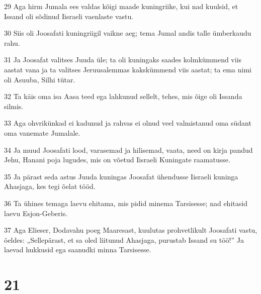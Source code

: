 \par 29 Aga hirm Jumala ees valdas kõigi maade kuningriike, kui nad kuulsid, et Issand oli sõdinud Iisraeli vaenlaste vastu.
\par 30 Siis oli Joosafati kuningriigil vaikne aeg; tema Jumal andis talle ümberkaudu rahu.
\par 31 Ja Joosafat valitses Juuda üle; ta oli kuningaks saades kolmkümmend viis aastat vana ja ta valitses Jeruusalemmas kakskümmend viis aastat; ta ema nimi oli Asuuba, Silhi tütar.
\par 32 Ta käis oma isa Aasa teed ega lahkunud sellelt, tehes, mis õige oli Issanda silmis.
\par 33 Aga ohvrikünkad ei kadunud ja rahvas ei olnud veel valmistanud oma südant oma vanemate Jumalale.
\par 34 Ja muud Joosafati lood, varasemad ja hilisemad, vaata, need on kirja pandud Jehu, Hanani poja lugudes, mis on võetud Iisraeli Kuningate raamatusse.
\par 35 Ja pärast seda astus Juuda kuningas Joosafat ühendusse Iisraeli kuninga Ahasjaga, kes tegi õelat tööd.
\par 36 Ta ühines temaga laevu ehitama, mis pidid minema Tarsisesse; nad ehitasid laevu Esjon-Geberis.
\par 37 Aga Elieser, Dodavahu poeg Maaresast, kuulutas prohvetlikult Joosafati vastu, öeldes: „Sellepärast, et sa oled liitunud Ahasjaga, purustab Issand su töö!” Ja laevad hukkusid ega saanudki minna Tarsisesse.

\chapter{21}

